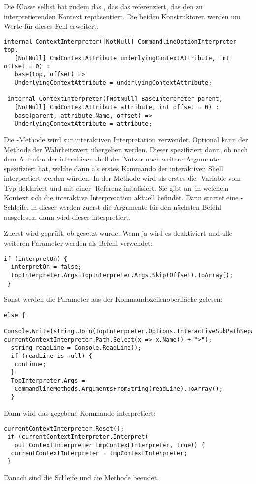 Die  Klasse selbst hat zudem das , das das  referenziert, das den zu interpretierenden Kontext repräsentiert.
Die beiden Konstruktoren werden um Werte für dieses Feld erweitert:
\begin{lstlisting}[language={[Sharp]C}, title=Konstruktoren der ContextInterpreter Klasse]
 internal ContextInterpreter([NotNull] CommandlineOptionInterpreter top,
   [NotNull] CmdContextAttribute underlyingContextAttribute, int offset = 0) :
   base(top, offset) =>
   UnderlyingContextAttribute = underlyingContextAttribute;

 internal ContextInterpreter([NotNull] BaseInterpreter parent,
   [NotNull] CmdContextAttribute attribute, int offset = 0) :
   base(parent, attribute.Name, offset) =>
   UnderlyingContextAttribute = attribute;
\end{lstlisting}
Die -Methode wird zur interaktiven Interpretation verwendet.
Optional kann der Methode der Wahrheitswert  übergeben werden.
Dieser spezifiziert dann, ob nach dem Aufrufen der interakiven shell der Nutzer noch weitere Argumente spezifiziert hat, welche dann als erstes Kommando der interaktiven Shell interpertiert werden würden.
In der Methode wird als erstes die -Variable vom Typ  deklariert und mit einer -Referenz initalisiert.
Sie gibt an, in welchem Kontext sich die interaktive Interpretation aktuell befindet.
Dann startet eine -Schleife.
In dieser werden zuerst die Argumente für den nächsten Befehl ausgelesen, dann wird dieser interpretiert.

Zuerst wird geprüft, ob  gesetzt wurde.
Wenn ja wird es deaktiviert und alle weiteren Parameter werden als Befehl verwendet:
\begin{lstlisting}[title=""]
 if (interpretOn) {
  interpretOn = false;
  TopInterpreter.Args=TopInterpreter.Args.Skip(Offset).ToArray();
 }
\end{lstlisting}
Sonst werden die Parameter aus der Kommandozeilenoberfläche gelesen:
\begin{lstlisting}[title=""]
 else {
  Console.Write(string.Join(TopInterpreter.Options.InteractiveSubPathSeparator, currentContextInterpreter.Path.Select(x => x.Name)) + ">");
  string readLine = Console.ReadLine();
  if (readLine is null) {
   continue;
  }
  TopInterpreter.Args =
   CommandlineMethods.ArgumentsFromString(readLine).ToArray();
  } \end{lstlisting}
Dann wird das gegebene Kommando interpretiert:
\begin{lstlisting}[title=""]
 currentContextInterpreter.Reset();
 if (currentContextInterpreter.Interpret(
   out ContextInterpreter tmpContextInterpreter, true)) {
  currentContextInterpreter = tmpContextInterpreter;
 }
\end{lstlisting}
Danach sind die Schleife und die Methode beendet.

